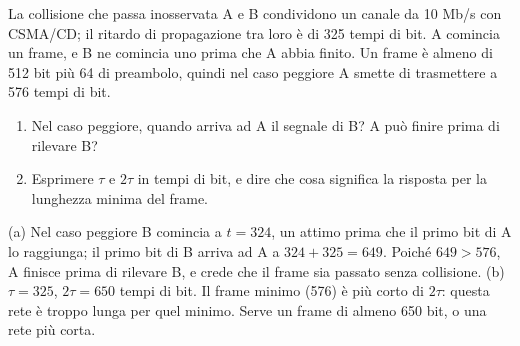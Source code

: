 \begin{esercizio}{La collisione che passa inosservata}
A e B condividono un canale da 10 Mb/s con CSMA/CD; il ritardo di propagazione tra loro è di 325 tempi di bit. A comincia un frame, e B ne
comincia uno prima che A abbia finito. Un frame è almeno di 512 bit più 64 di preambolo, quindi nel caso peggiore A smette di trasmettere a
576 tempi di bit.
\begin{enumerate}[label=(\alph*)]
    \item Nel caso peggiore, quando arriva ad A il segnale di B? A può finire prima di rilevare B?
    \item Esprimere $\tau$ e $2\tau$ in tempi di bit, e dire che cosa significa la risposta per la lunghezza minima del frame.
\end{enumerate}

\svolgimento
(a) Nel caso peggiore B comincia a $t = 324$, un attimo prima che il primo bit di A lo raggiunga; il primo bit di B arriva ad A a $324 + 325
= 649$. Poiché $649 > 576$, A finisce prima di rilevare B, e crede che il frame sia passato senza collisione. (b) $\tau = 325$, $2\tau =
650$ tempi di bit. Il frame minimo (576) è più corto di $2\tau$: questa rete è troppo lunga per quel minimo. Serve un frame di almeno 650
bit, o una rete più corta.
\end{esercizio}

